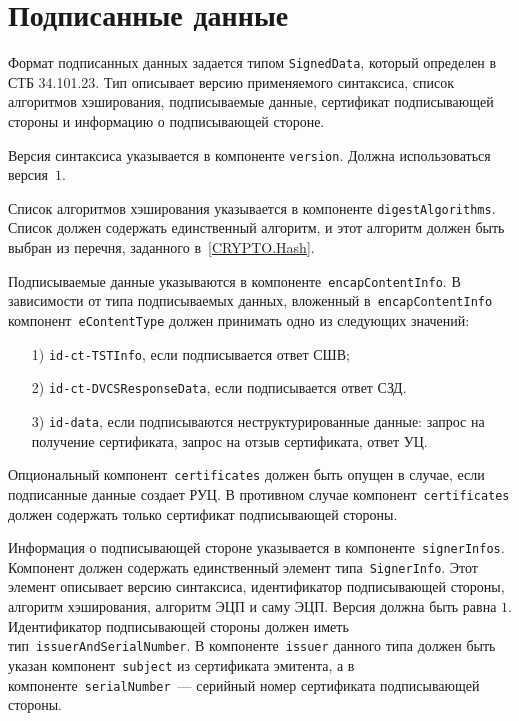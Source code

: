 \section{Подписанные данные}\label{FMT.SignedData}

Формат подписанных данных задается типом \texttt{SignedData}, 
который определен в СТБ 34.101.23. Тип описывает версию применяемого 
синтаксиса, список алгоритмов хэширования, подписываемые данные, 
сертификат подписывающей стороны и информацию о подписывающей стороне. 

Версия синтаксиса указывается в компоненте \texttt{version}.
Должна использоваться версия~$1$.

Список алгоритмов хэширования указывается в компоненте
\texttt{digestAlgorithms}. Список должен содержать единственный алгоритм,
и этот алгоритм должен быть выбран из перечня, 
заданного в~\ref{CRYPTO.Hash}.

Подписываемые данные указываются в компоненте~\texttt{encapContentInfo}. 
%
В зависимости от типа подписываемых данных, вложенный 
в~\texttt{encapContentInfo} компонент~\texttt{eContentType} 
должен принимать одно из следующих значений:
\begin{enumerate}
\item[1)]
\texttt{id-ct-TSTInfo}, если подписывается ответ СШВ;
\item[2)]
\texttt{id-ct-DVCSResponseData}, если подписывается ответ СЗД. 
\item[3)]
\texttt{id-data}, если подписываются неструктурированные данные:
запрос на получение сертификата, запрос на отзыв сертификата,
ответ УЦ.
\end{enumerate}



Опциональный компонент~\texttt{certificates} должен быть опущен в случае, 
если подписанные данные создает РУЦ. В противном случае 
компонент~\texttt{certificates} должен содержать только сертификат 
подписывающей стороны.

Информация о подписывающей стороне указывается в
компоненте~\texttt{signerInfos}. Компонент должен содержать единственный
элемент типа~\texttt{SignerInfo}. Этот элемент описывает версию синтаксиса,
идентификатор подписывающей стороны, алгоритм хэширования, алгоритм ЭЦП и
саму ЭЦП. Версия должна быть равна $1$. Идентификатор подписывающей стороны
должен иметь тип~\texttt{issuerAndSerialNumber}. В 
компоненте~\texttt{issuer} данного типа должен быть указан 
компонент~\texttt{subject} из сертификата эмитента, а в  
компоненте~\texttt{serialNumber}~--- серийный номер сертификата 
подписывающей стороны. 

